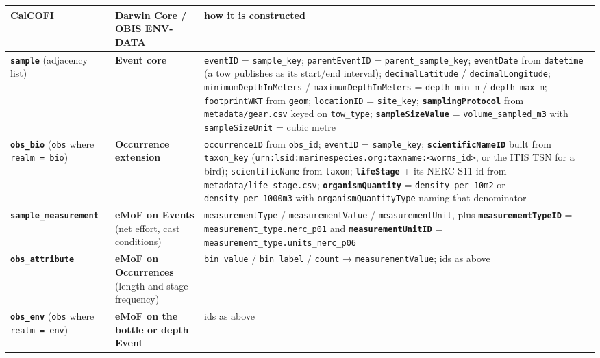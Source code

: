 \documentclass[
  letterpaper,
  DIV=11,
  numbers=noendperiod]{scrreprt}
\begin{document}
\begin{longtable}[]{@{}
  >{\raggedright\arraybackslash}p{}
  >{\raggedright\arraybackslash}p{}
  >{\raggedright\arraybackslash}p{}@{}}
\toprule\noalign{}
\begin{minipage}[b]{\linewidth}\raggedright
CalCOFI
\end{minipage} & \begin{minipage}[b]{\linewidth}\raggedright
Darwin Core / OBIS ENV-DATA
\end{minipage} & \begin{minipage}[b]{\linewidth}\raggedright
how it is constructed
\end{minipage} \\
\midrule\noalign{}
\endhead
\bottomrule\noalign{}
\endlastfoot
\textbf{\texttt{sample}} (adjacency list) & \textbf{Event core} &
\texttt{eventID} = \texttt{sample\_key}; \texttt{parentEventID} =
\texttt{parent\_sample\_key}; \texttt{eventDate} from \texttt{datetime}
(a tow publishes as its start/end interval); \texttt{decimalLatitude} /
\texttt{decimalLongitude}; \texttt{minimumDepthInMeters} /
\texttt{maximumDepthInMeters} = \texttt{depth\_min\_m} /
\texttt{depth\_max\_m}; \texttt{footprintWKT} from \texttt{geom};
\texttt{locationID} = \texttt{site\_key};
\textbf{\texttt{samplingProtocol}} from \texttt{metadata/gear.csv} keyed
on \texttt{tow\_type}; \textbf{\texttt{sampleSizeValue}} =
\texttt{volume\_sampled\_m3} with \texttt{sampleSizeUnit} = cubic
metre \\
\textbf{\texttt{obs\_bio}} (\texttt{obs} where
\texttt{realm\ =\ \textquotesingle{}bio\textquotesingle{}}) &
\textbf{Occurrence extension} & \texttt{occurrenceID} from
\texttt{obs\_id}; \texttt{eventID} = \texttt{sample\_key};
\textbf{\texttt{scientificNameID}} built from \texttt{taxon\_key}
(\texttt{urn:lsid:marinespecies.org:taxname:\textless{}worms\_id\textgreater{}},
or the ITIS TSN for a bird); \texttt{scientificName} from
\texttt{taxon}; \textbf{\texttt{lifeStage}} + its NERC S11 id from
\texttt{metadata/life\_stage.csv}; \textbf{\texttt{organismQuantity}} =
\texttt{density\_per\_10m2} or \texttt{density\_per\_1000m3} with
\texttt{organismQuantityType} naming that denominator \\
\textbf{\texttt{sample\_measurement}} & \textbf{eMoF on Events} (net
effort, cast conditions) & \texttt{measurementType} /
\texttt{measurementValue} / \texttt{measurementUnit}, plus
\textbf{\texttt{measurementTypeID}} =
\texttt{measurement\_type.nerc\_p01} and
\textbf{\texttt{measurementUnitID}} =
\texttt{measurement\_type.units\_nerc\_p06} \\
\textbf{\texttt{obs\_attribute}} & \textbf{eMoF on Occurrences} (length
and stage frequency) & \texttt{bin\_value} / \texttt{bin\_label} /
\texttt{count} → \texttt{measurementValue}; ids as above \\
\textbf{\texttt{obs\_env}} (\texttt{obs} where
\texttt{realm\ =\ \textquotesingle{}env\textquotesingle{}}) &
\textbf{eMoF on the bottle or depth Event} & ids as above \\
\end{longtable}
\end{document}
